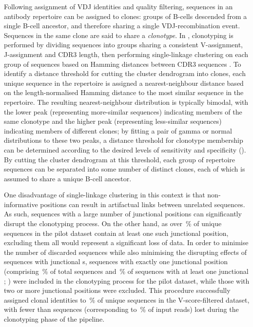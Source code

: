 Following assignment of VDJ identities and quality filtering, sequences in an antibody repertoire can be assigned to clones: groups of B-cells descended from a single \naive B-cell ancestor, and therefore sharing a single VDJ-recombination event. Sequences in the same clone are said to share a \textit{clonotype}. In , clonotyping is performed by dividing sequences into groups sharing a consistent V-assignment, J-assignment and CDR3 length, then performing single-linkage clustering on each group of sequences based on Hamming distances between CDR3 sequences \parencite{gupta2017hierarchical}. To identify a distance threshold for cutting the cluster dendrogram into clones, each unique sequence in the repertoire is assigned a nearest-neighbour distance based on the length-normalised Hamming distance to the most similar sequence in the repertoire. The resulting nearest-neighbour distribution is typically bimodal, with the lower peak (representing more-similar sequences) indicating members of the same clonotype and the higher peak (representing less-similar sequences) indicating members of different clones; by fitting a pair of gamma or normal distributions to these two peaks, a distance threshold for clonotype membership can be determined according to the desired levels of sensitivity and specificity \parencite{nouri2018threshold} (). By cutting the cluster dendrogram at this threshold, each group of repertoire sequences can be separated into some number of distinct clones, each of which is assumed to share a unique \naive B-cell ancestor.

One disadvantage of single-linkage clustering in this context is that non-informative  positions can result in artifactual links between unrelated sequences. As such, sequences with a large number of junctional  positions can significantly disrupt the clonotyping process. On the other hand, as over \,\% of unique sequences in the pilot dataset contain at least one such junctional  position, excluding them all would represent a significant loss of data. In order to minimise the number of discarded sequences while also minimising the disrupting effects of sequences with junctional s, sequences with exactly one junctional  position (comprising \,\% of total sequences and \,\% of sequences with at least one junctional ; ) were included in the clonotyping process for the pilot dataset, while those with two or more junctional  positions were excluded. This procedure successfully assigned clonal identities to \,\% of unique sequences in the V-score-filtered dataset, with fewer than  sequences (corresponding to \,\% of input reads) lost during the clonotyping phase of the pipeline.


